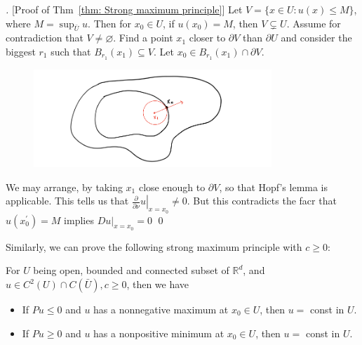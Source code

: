 \vspace{2em}

\begin{proof}[][Proof of Thm~\ref{thm: Strong maximum principle}]
 Let $V=\{x \in U: u(x) \leq M\}$, where $M=\sup _{\bar{U}} u$. Then for $x_{0} \in U$, if $u\left(x_{0}\right)=M$, then $V \subsetneq U$. Assume for contradiction that $V \neq \varnothing$. Find a point $x_{1}$ closer to $\partial V$ than $\partial U$ and consider the biggest $r_{1}$ such that $B_{r_{1}}\left(x_{1}\right) \subseteq V$. Let $x_{0} \in B_{r_{1}}\left(x_{1}\right) \cap \partial V$. 
\begin{figure}[H]
    \centering
    \includegraphics[width=0.8\textwidth]{figures/12-Strong-maximal.png}
\end{figure}
We may arrange, by taking $x_{1}$ close enough to $\partial V$, so that Hopf's lemma is applicable. This tells us that $\left.\frac{\partial}{\partial \nu} u\right|_{x=x_{0}} \neq 0$. But this contradicts the facr that $u\left(x_{0}^{\prime}\right)=M$ implies $\left.D u\right|_{x=x_{0}}=0$
\qed
\end{proof}

Similarly, we can prove the following strong maximum principle with $c\ge 0$: 

\begin{theorem}
\label{thm: Strong maximum principle with cge 0}
For $U$ being open, bounded and connected subset of $\mathbb{R}^{d}$, and $u \in C^{2}(U) \cap C(\bar{U}), c \geq 0$, then we have
\begin{itemize}
    \item If $Pu \le 0$ and $u$ has a nonnegative maximum at $x_0\in U$, then $u=$ const in $U$. 
    \item If $Pu \ge 0$ and $u$ has a nonpositive minimum at $x_0 \in U$, then $u=$ const in $U$. 
\end{itemize}
\end{theorem}



